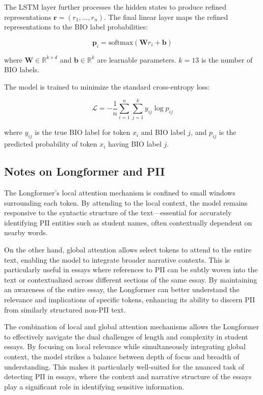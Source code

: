 \documentclass[11pt]{article}
\begin{document}
The LSTM layer further processes the hidden states to produce refined representations $\mathbf{r} = (r_1, \ldots, r_n)$. The final linear layer maps the refined representations to the BIO label probabilities:

\begin{equation*}
\mathbf{p}_i = \text{softmax}(\mathbf{W}r_i + \mathbf{b})
\end{equation*}

where $\mathbf{W} \in \mathbb{R}^{k \times d}$ and $\mathbf{b} \in \mathbb{R}^k$ are learnable parameters. $k=13$ is the number of BIO labels.

The model is trained to minimize the standard cross-entropy loss:

\begin{equation*}
\mathcal{L} = -\frac{1}{n} \sum_{i=1}^n \sum_{j=1}^k y_{ij} \log p_{ij}
\end{equation*}

where $y_{ij}$ is the true BIO label for token $x_i$ and BIO label $j$, and $p_{ij}$ is the predicted probability of token $x_i$ having BIO label $j$.


\subsection{Notes on Longformer and PII}

The Longformer's local attention mechanism is confined to small windows surrounding each token. By attending to the local context, the model remains responsive to the syntactic structure of the text—essential for accurately identifying PII entities such as student names, often contextually dependent on nearby words.

On the other hand, global attention allows select tokens to attend to the entire text, enabling the model to integrate broader narrative contexts. This is particularly useful in essays where references to PII can be subtly woven into the text or contextualized across different sections of the same essay. By maintaining an awareness of the entire essay, the Longformer can better understand the relevance and implications of specific tokens, enhancing its ability to discern PII from similarly structured non-PII text.

The combination of local and global attention mechanisms allows the Longformer to effectively navigate the dual challenges of length and complexity in student essays. By focusing on local relevance while simultaneously integrating global context, the model strikes a balance between depth of focus and breadth of understanding. This makes it particularly well-suited for the nuanced task of detecting PII in essays, where the context and narrative structure of the essays play a significant role in identifying sensitive information.
\end{document}
